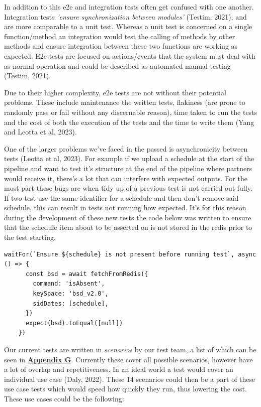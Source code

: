   In addition to this e2e and integration tests often get confused with one another. Integration tests \textit{'ensure synchronization between modules'}
  (Testim, 2021), and are more comparable to a unit test. Whereas a unit test is concerned on a single function/method an integration would test the calling of 
  methods by other methods and ensure integration between these two functions are working as expected. E2e tests are focused on actions/events that the 
  system must deal with as normal operation and could be described as automated manual testing (Testim, 2021).
  
  Due to their higher complexity, e2e tests are not without their potential problems. These include maintenance the written 
  tests, flakiness (are prone to randomly pass or fail without any discernable reason), time taken to run the tests and the cost of both the 
  execution of the tests and the time to write them (Yang and Leotta et al, 2023). 

  One of the larger problems we've faced in the passed is asynchronicity between tests (Leotta et al, 2023). For example if we upload a schedule at the 
  start of the pipeline and want to test it's structure at the end of the pipeline where partners would receive it, there's a lot that can interfere with 
  expected outputs. For the most part these bugs are when tidy up of a previous test is not carried out fully. If two test use the same identifier 
  for a schedule and then don't remove said schedule, this can result in tests not running how expected. It's for this reason during the development 
  of these new tests the code below was written to ensure that the schedule item about to be asserted on is not stored in the redis prior to the 
  test starting.

  \begin{lstlisting}[caption=Code to ensure schedule to asserted on is not present at the start of the test.]
    waitFor(`Ensure ${schedule} is not present before running test`, async () => {
      const bsd = await fetchFromRedis({
        command: 'isAbsent',
        keySpace: 'bsd_v2.0',
        sidDates: [schedule],
      })
      expect(bsd).toEqual([null])
    })
  \end{lstlisting} 

  Our current tests are written in \textit{scenarios} by our test team, a list of which can be seen in \hyperref[sec:AppendixG]{\textbf{Appendix G}}.
  Currently these cover all possible scenarios, however have a lot of overlap and repetitiveness. In an ideal world a test would cover an individual
  use case (Daly, 2022). These 14 scenarios could then be a part of these use case tests which would speed how quickly they run, thus lowering the cost.
  These use cases could be the following:

